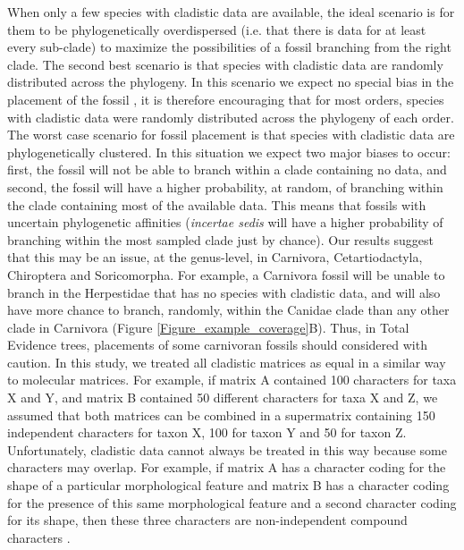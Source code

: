 When only a few species with cladistic data are available, the ideal scenario is for them to be phylogenetically overdispersed (i.e. that there is data for at least every sub-clade) to maximize the possibilities of a fossil branching from the right clade.
The second best scenario is that species with cladistic data are randomly distributed across the phylogeny. 
In this scenario we expect no special bias in the placement of the fossil \citep{GuillermeCooper}, it is therefore encouraging that for most orders, species with cladistic data were randomly distributed across the phylogeny of each order.
The worst case scenario for fossil placement is that species with cladistic data are phylogenetically clustered. 
In this situation we expect two major biases to occur: first, the fossil will not be able to branch within a clade containing no data, and second, the fossil will have a higher probability, at random, of branching within the clade containing most of the available data.
This means that fossils with uncertain phylogenetic affinities (\textit{incertae sedis} will have a higher probability of branching within the most sampled clade just by chance).
Our results suggest that this may be an issue, at the genus-level, in Carnivora, Cetartiodactyla, Chiroptera and Soricomorpha. 
For example, a Carnivora fossil will be unable to branch in the Herpestidae that has no species with cladistic data, and will also have more chance to branch, randomly, within the Canidae clade than any other clade in Carnivora (Figure \ref{Figure_example_coverage}B).
Thus, in Total Evidence trees, placements of some carnivoran fossils should considered with caution. 
In this study, we treated all cladistic matrices as equal in a similar way to molecular matrices. 
For example, if matrix A contained 100 characters for taxa X and Y, and matrix B contained 50 different characters for taxa X and Z, we assumed that both matrices can be combined in a supermatrix containing 150 independent characters for taxon X, 100 for taxon Y and 50 for taxon Z.
Unfortunately, cladistic data cannot always be treated in this way because some characters may overlap.
For example, if matrix A has a character coding for the shape of a particular morphological feature and matrix B has a character coding for the presence of this same morphological feature and a second character coding for its shape, then these three characters are non-independent compound characters \citep{Brazeau2011}.
